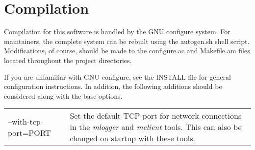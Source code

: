\section{Compilation}
Compilation for this software is handled by the GNU configure system.
For maintainers, the complete system can be rebuilt using the autogen.sh
shell script.  Modifications, of course, should be made to the
configure.ac and Makefile.am files located throughout the project
directories.

If you are unfamiliar with GNU configure, see the INSTALL file for
general configuration instructions.  In addition, the following additions
should be considered along with the base options.

\begin{table}[h]
\begin{tabular}{l p{12cm}}
--with-tcp-port=PORT &
Set the default TCP port for network connections in the \emph{mlogger}
and \emph{mclient} tools.  This can also be changed on startup with these
tools.\\

\end{tabular}
\end{table}

